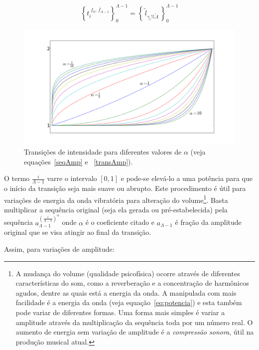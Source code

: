 \begin{equation}\label{serieAmostralLog}
\left\{t_i^{\;\overline{f_0,\,f_{\Lambda-1}}}\right\}_0^{\Lambda-1}=\left\{\,\widetilde{l}_{\gamma_i \% \widetilde{\Lambda}}\,\right\}_0^{\Lambda-1}
\end{equation}

\begin{figure}[h!]
    \centering
        \includegraphics[width=\textwidth]{figuras/transicao}
    \caption{Transições de intensidade para diferentes valores de $\alpha$ (veja equações~\ref{seqAmp} e ~\ref{transAmp}).}
        \label{fig:transicao}
\end{figure}


O termo $\frac{i}{\Lambda-1}$ varre o intervalo $[0,1]$ e pode-se elevá-lo a uma potência
para que o início da transição seja mais suave ou abrupto.
Este procedimento é útil para variações de energia
da onda vibratória para alteração do volume\footnote{A mudança do volume (qualidade psicofísica) ocorre através de diferentes características 
do som, como a reverberação e a concentração de harmônicos agudos, dentre as quais está a energia da onda.
A manipulada com mais facilidade é a energia da onda (veja equação~\ref{eq:potencia}) e esta também pode variar de diferentes formas.
Uma forma mais simples é variar a amplitude através da multiplicação da sequência toda
por um número real. O aumento de energia sem variação de
amplitude é a \emph{compressão sonora}, útil na
produção musical atual.\cite{guillaume}}. Basta multiplicar a sequência original
(seja ela gerada ou pré-estabelecida) pela sequência $a_{\Lambda-1}^{\left( \frac{i}{\Lambda-1} \right )^\alpha}$
onde $\alpha$ é o coeficiente citado e $a_{\Lambda-1}$ é fração da amplitude original que se visa atingir ao final da transição.

Assim, para variações de amplitude:

